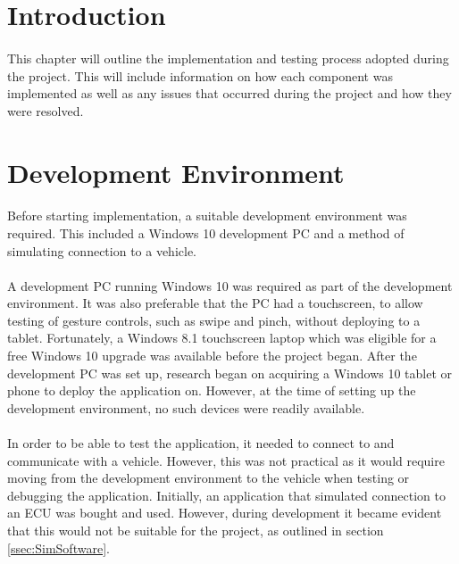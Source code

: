 \section{Introduction}
	\paragraph{}{
	This chapter will outline the implementation and testing process adopted during the project. This will include information on how each component was implemented as well as any issues that occurred during the project and how they were resolved.
	}
\section{Development Environment}
	\paragraph{}{%
	Before starting implementation, a suitable development environment was required. This included a Windows 10 development PC and a method of simulating connection to a vehicle. 
	}
	\paragraph{}{
	A development PC running Windows 10 was required as part of the development environment. It was also preferable that the PC had a touchscreen, to allow testing of gesture controls, such as swipe and pinch, without deploying to a tablet. Fortunately, a Windows 8.1 touchscreen laptop which was eligible for a free Windows 10 upgrade was available before the project began. After the development PC was set up, research began on acquiring a Windows 10 tablet or phone to deploy the application on. However, at the time of setting up the development environment, no such devices were readily available.			
	}
	\paragraph{}{
	In order to be able to test the application, it needed to connect to and communicate with a vehicle. However, this was not practical as it would require moving from the development environment to the vehicle when testing or debugging the application. Initially, an application that simulated connection to an ECU was bought and used. However, during development it became evident that this would not be suitable for the project, as outlined in section \ref{ssec:SimSoftware}.
	}
